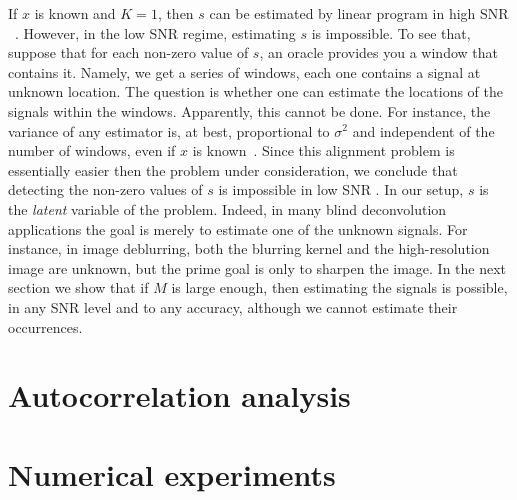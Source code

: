 \documentclass[english]{article}
\numberwithin{equation}{section}
\theoremstyle{plain}
\theoremstyle{definition}
\theoremstyle{remark}
\theoremstyle{plain}
\theoremstyle{remark}
\theoremstyle{plain}
\theoremstyle{plain}
\newcommand{\SNR}{\textsf{SNR} }
\begin{document}
If $x$ is known and $K=1$, then  $s$ can be estimated by linear program in high \SNR~\cite{de2012exact,duval2015exact,bendory2016robust,bendory2017robust,bernstein2017deconvolution}. However, in the low \SNR regime, estimating $s$ is impossible. To see that, suppose that for each non-zero value of $s$, an oracle provides you 
a window that contains it. Namely, we get a series of windows, each one contains a signal at unknown location. The question is whether one can estimate the locations of the signals within the windows. Apparently, this cannot be done. For instance, the variance of any estimator is, at best, proportional to $\sigma^2$ and independent of the number of windows, even if $x$ is known~\cite{aguerrebere2016fundamental}.  Since this alignment problem is essentially easier then the problem under consideration, we conclude that detecting the non-zero values of $s$ is impossible in low \SNR. In our setup, $s$ is the \emph{latent} variable of the problem. Indeed, in many blind deconvolution applications the goal is merely to estimate one of the unknown signals. For instance, in image deblurring, both the blurring
kernel and the high-resolution image are unknown, but the prime goal is only
to sharpen the image.
In the next section we show that if $M$ is large enough, then estimating the signals is possible, in any \SNR level and to any accuracy, although we cannot estimate their occurrences. 



\section{Autocorrelation analysis}   \label{sec:autocorrelation}



\section{Numerical experiments}   \label{sec:numerics}




\end{document}
